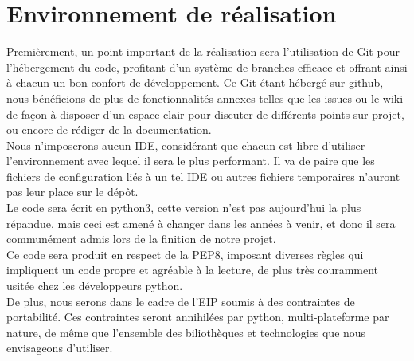 \section{Environnement de réalisation}
Premièrement, un point important de la réalisation sera l'utilisation de Git pour l'hébergement du code, profitant d'un système de branches efficace et offrant ainsi à chacun un bon confort de développement. Ce Git étant hébergé sur github, nous bénéficions de plus de fonctionnalités annexes telles que les issues ou le wiki de façon à disposer d'un espace clair pour discuter de différents points sur projet, ou encore de rédiger de la documentation.\\

Nous n'imposerons aucun IDE, considérant que chacun est libre d'utiliser l'environnement avec lequel il sera le plus performant. Il va de paire que les fichiers de configuration liés à un tel IDE ou autres fichiers temporaires n'auront pas leur place sur le dépôt.\\

Le code sera écrit en python3, cette version n'est pas aujourd'hui la plus répandue, mais ceci est amené à changer dans les années à venir, et donc il sera communément admis lors de la finition de notre projet.\\
Ce code sera produit en respect de la PEP8, imposant diverses règles qui impliquent un code propre et agréable à la lecture, de plus très couramment usitée chez les développeurs python.\\

De plus, nous serons dans le cadre de l'EIP soumis à des contraintes de portabilité. Ces contraintes seront annihilées par python, multi-plateforme par nature, de même que l'ensemble des biliothèques et technologies que nous envisageons d'utiliser.

